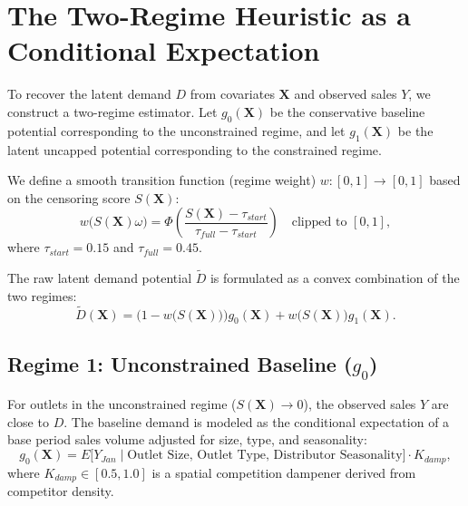 \documentclass[11pt,a4paper]{article}
\theoremstyle{definition}
\begin{document}
\section{The Two-Regime Heuristic as a Conditional Expectation}
To recover the latent demand $D$ from covariates $\bm{X}$ and observed sales $Y$, we construct a two-regime estimator. Let $g_0(\bm{X})$ be the conservative baseline potential corresponding to the unconstrained regime, and let $g_1(\bm{X})$ be the latent uncapped potential corresponding to the constrained regime.

We define a smooth transition function (regime weight) $w : [0, 1] \to [0, 1]$ based on the censoring score $S(\bm{X})$:
\begin{equation}
    w\big(S(\bm{X})\omega\big) = \Phi\left(\frac{S(\bm{X}) - \tau_{start}}{\tau_{full} - \tau_{start}}\right) \quad \text{clipped to } [0,1],
\end{equation}
where $\tau_{start} = 0.15$ and $\tau_{full} = 0.45$.

The raw latent demand potential $\tilde{D}$ is formulated as a convex combination of the two regimes:
\begin{equation}
    \tilde{D}(\bm{X}) = \Big(1 - w\big(S(\bm{X})\big)\Big) g_0(\bm{X}) + w\big(S(\bm{X})\big) g_1(\bm{X}).
\end{equation}

\subsection{Regime 1: Unconstrained Baseline ($g_0$)}
For outlets in the unconstrained regime ($S(\bm{X}) \to 0$), the observed sales $Y$ are close to $D$. The baseline demand is modeled as the conditional expectation of a base period sales volume adjusted for size, type, and seasonality:
\begin{equation}
    g_0(\bm{X}) = E\big[Y_{Jan} \mid \text{Outlet Size, Outlet Type, Distributor Seasonality}\big] \cdot K_{damp},
\end{equation}
where $K_{damp} \in [0.5, 1.0]$ is a spatial competition dampener derived from competitor density.
\end{document}

